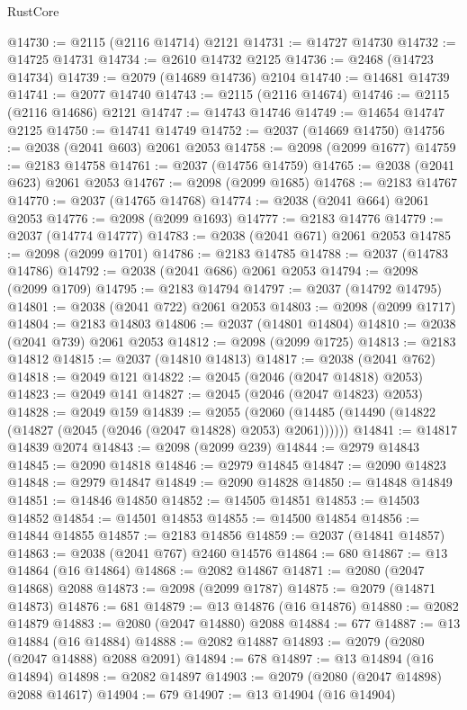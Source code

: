 \begin{lexlean}{RustCore}
\begin{coremodule}
@14730 := @2115 (@2116 @14714) @2121
@14731 := @14727 @14730
@14732 := @14725 @14731
@14734 := @2610 @14732 @2125
@14736 := @2468 (@14723 @14734)
@14739 := @2079 (@14689 @14736) @2104
@14740 := @14681 @14739
@14741 := @2077 @14740
@14743 := @2115 (@2116 @14674)
@14746 := @2115 (@2116 @14686) @2121
@14747 := @14743 @14746
@14749 := @14654 @14747 @2125
@14750 := @14741 @14749
@14752 := @2037 (@14669 @14750)
@14756 := @2038 (@2041 @603) @2061 @2053
@14758 := @2098 (@2099 @1677)
@14759 := @2183 @14758
@14761 := @2037 (@14756 @14759)
@14765 := @2038 (@2041 @623) @2061 @2053
@14767 := @2098 (@2099 @1685)
@14768 := @2183 @14767
@14770 := @2037 (@14765 @14768)
@14774 := @2038 (@2041 @664) @2061 @2053
@14776 := @2098 (@2099 @1693)
@14777 := @2183 @14776
@14779 := @2037 (@14774 @14777)
@14783 := @2038 (@2041 @671) @2061 @2053
@14785 := @2098 (@2099 @1701)
@14786 := @2183 @14785
@14788 := @2037 (@14783 @14786)
@14792 := @2038 (@2041 @686) @2061 @2053
@14794 := @2098 (@2099 @1709)
@14795 := @2183 @14794
@14797 := @2037 (@14792 @14795)
@14801 := @2038 (@2041 @722) @2061 @2053
@14803 := @2098 (@2099 @1717)
@14804 := @2183 @14803
@14806 := @2037 (@14801 @14804)
@14810 := @2038 (@2041 @739) @2061 @2053
@14812 := @2098 (@2099 @1725)
@14813 := @2183 @14812
@14815 := @2037 (@14810 @14813)
@14817 := @2038 (@2041 @762)
@14818 := @2049 @121
@14822 := @2045 (@2046 (@2047 @14818) @2053)
@14823 := @2049 @141
@14827 := @2045 (@2046 (@2047 @14823) @2053)
@14828 := @2049 @159
@14839 := @2055
    (@2060 (@14485 (@14490 (@14822 (@14827 (@2045 (@2046 (@2047 @14828) @2053) @2061))))))
@14841 := @14817 @14839 @2074
@14843 := @2098 (@2099 @239)
@14844 := @2979 @14843
@14845 := @2090 @14818
@14846 := @2979 @14845
@14847 := @2090 @14823
@14848 := @2979 @14847
@14849 := @2090 @14828
@14850 := @14848 @14849
@14851 := @14846 @14850
@14852 := @14505 @14851
@14853 := @14503 @14852
@14854 := @14501 @14853
@14855 := @14500 @14854
@14856 := @14844 @14855
@14857 := @2183 @14856
@14859 := @2037 (@14841 @14857)
@14863 := @2038 (@2041 @767) @2460 @14576
@14864 := 680
@14867 := @13 @14864 (@16 @14864)
@14868 := @2082 @14867
@14871 := @2080 (@2047 @14868) @2088
@14873 := @2098 (@2099 @1787)
@14875 := @2079 (@14871 @14873)
@14876 := 681
@14879 := @13 @14876 (@16 @14876)
@14880 := @2082 @14879
@14883 := @2080 (@2047 @14880) @2088
@14884 := 677
@14887 := @13 @14884 (@16 @14884)
@14888 := @2082 @14887
@14893 := @2079 (@2080 (@2047 @14888) @2088 @2091)
@14894 := 678
@14897 := @13 @14894 (@16 @14894)
@14898 := @2082 @14897
@14903 := @2079 (@2080 (@2047 @14898) @2088 @14617)
@14904 := 679
@14907 := @13 @14904 (@16 @14904)

\end{coremodule}
\end{lexlean}
